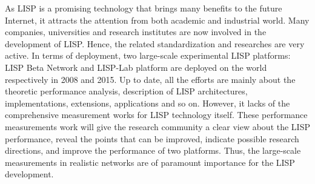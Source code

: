 
As LISP is a promising technology that brings many benefits to the future Internet, it attracts the attention from both academic and industrial world. Many companies, universities and research institutes are now involved in the development of LISP. Hence, the related standardization and researches are very active. In terms of deployment, two large-scale experimental LISP platforms: LISP Beta Network and LISP-Lab platform are deployed on the world respectively in 2008 and 2015. Up to date, all the efforts are mainly about the theoretic performance analysis, description of LISP architectures, implementations, extensions, applications and so on. However, it lacks of the comprehensive measurement works for LISP technology itself. These performance measurements work will give the research community a clear view about the LISP performance, reveal the points that can be improved, indicate possible research directions, and improve the performance of two platforms. Thus, the large-scale measurements in realistic networks are of paramount importance for the LISP development.

